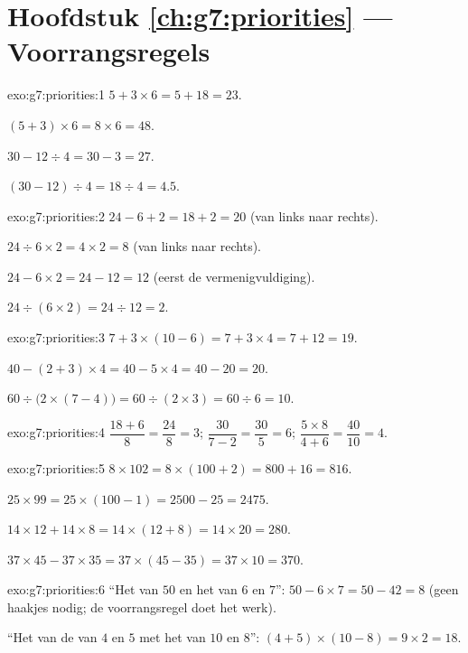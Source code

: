 \section*{Hoofdstuk \ref{ch:g7:priorities} --- Voorrangsregels}

\begin{solution}{exo:g7:priorities:1}
$5 + 3 \times 6 = 5 + 18 = 23$.

$(5 + 3) \times 6 = 8 \times 6 = 48$.

$30 - 12 \div 4 = 30 - 3 = 27$.

$(30 - 12) \div 4 = 18 \div 4 = 4.5$.
\end{solution}

\begin{solution}{exo:g7:priorities:2}
$24 - 6 + 2 = 18 + 2 = 20$ (van links naar rechts).

$24 \div 6 \times 2 = 4 \times 2 = 8$ (van links naar rechts).

$24 - 6 \times 2 = 24 - 12 = 12$ (eerst de vermenigvuldiging).

$24 \div (6 \times 2) = 24 \div 12 = 2$.
\end{solution}

\begin{solution}{exo:g7:priorities:3}
$7 + 3 \times (10 - 6) = 7 + 3 \times 4 = 7 + 12 = 19$.

$40 - (2 + 3) \times 4 = 40 - 5 \times 4 = 40 - 20 = 20$.

$60 \div \bigl(2 \times (7 - 4)\bigr) = 60 \div (2 \times 3) = 60 \div 6 = 10$.
\end{solution}

\begin{solution}{exo:g7:priorities:4}
$\dfrac{18 + 6}{8} = \dfrac{24}{8} = 3$; \quad
$\dfrac{30}{7 - 2} = \dfrac{30}{5} = 6$; \quad
$\dfrac{5 \times 8}{4 + 6} = \dfrac{40}{10} = 4$.
\end{solution}

\begin{solution}{exo:g7:priorities:5}
$8 \times 102 = 8 \times (100 + 2) = 800 + 16 = 816$.

$25 \times 99 = 25 \times (100 - 1) = 2500 - 25 = 2475$.

$14 \times 12 + 14 \times 8 = 14 \times (12 + 8) = 14 \times 20 = 280$.

$37 \times 45 - 37 \times 35 = 37 \times (45 - 35) = 37 \times 10 = 370$.
\end{solution}

\begin{solution}{exo:g7:priorities:6}
``Het  van $50$ en het  van $6$ en $7$'':
$50 - 6 \times 7 = 50 - 42 = 8$ (geen haakjes nodig; de voorrangsregel doet het
werk).

``Het  van de  van $4$ en $5$ met het  van $10$ en $8$'':
$(4 + 5) \times (10 - 8) = 9 \times 2 = 18$.
\end{solution}

